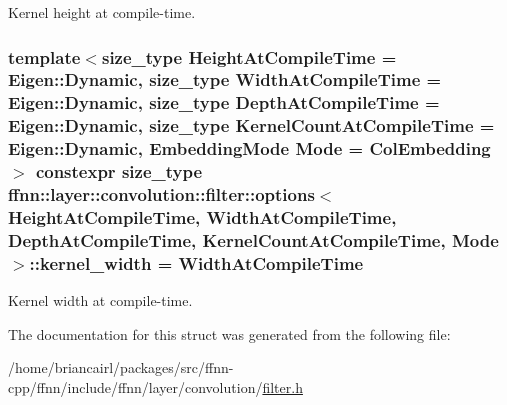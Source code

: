 Kernel height at compile-\/time. 

\hypertarget{structffnn_1_1layer_1_1convolution_1_1filter_1_1options_afd97cb92020381b3f2489b92946fdc11}{
\subsubsection[{kernel\-\_\-width}]{\setlength{\rightskip}{0pt plus 5cm}template$<$size\-\_\-type Height\-At\-Compile\-Time = Eigen\-::\-Dynamic, size\-\_\-type Width\-At\-Compile\-Time = Eigen\-::\-Dynamic, size\-\_\-type Depth\-At\-Compile\-Time = Eigen\-::\-Dynamic, size\-\_\-type Kernel\-Count\-At\-Compile\-Time = Eigen\-::\-Dynamic, Embedding\-Mode Mode = Col\-Embedding$>$ constexpr {\bf size\-\_\-type} {\bf ffnn\-::layer\-::convolution\-::filter\-::options}$<$ Height\-At\-Compile\-Time, Width\-At\-Compile\-Time, Depth\-At\-Compile\-Time, Kernel\-Count\-At\-Compile\-Time, Mode $>$\-::kernel\-\_\-width = Width\-At\-Compile\-Time\hspace{0.3cm}{\ttfamily [static]}}}\label{structffnn_1_1layer_1_1convolution_1_1filter_1_1options_afd97cb92020381b3f2489b92946fdc11}


Kernel width at compile-\/time. 



The documentation for this struct was generated from the following file\-:\begin{DoxyCompactItemize}
\item 
/home/briancairl/packages/src/ffnn-\/cpp/ffnn/include/ffnn/layer/convolution/\hyperlink{filter_8h}{filter.\-h}\end{DoxyCompactItemize}
